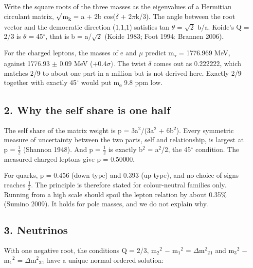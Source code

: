 \documentclass[
  11pt,
]{article}
\begin{document}
Write the square roots of the three masses as the eigenvalues of a Hermitian circulant matrix, \ensuremath{\surd}m\textsubscript{k} = a + 2\textbar b\textbar{} cos(\ensuremath{\delta} + 2\ensuremath{\pi}k/3). The angle between the root vector and the democratic direction (1,1,1) satisfies tan \ensuremath{\theta} = \ensuremath{\sqrt{2}} \textbar b\textbar/a. Koide's Q = 2/3 is \ensuremath{\theta} = 45\ensuremath{^\circ}, that is \textbar b\textbar{} = a/\ensuremath{\sqrt{2}} (Koide 1983; Foot 1994; Brannen 2006).

For the charged leptons, the masses of e and \ensuremath{\mu} predict m\textsubscript{\ensuremath{\tau}} = 1776.969 MeV, against 1776.93 \ensuremath{\pm} 0.09 MeV (+0.4\ensuremath{\sigma}). The twist \ensuremath{\delta} comes out as 0.222222, which matches 2/9 to about one part in a million but is not derived here. Exactly 2/9 together with exactly 45\ensuremath{^\circ} would put m\textsubscript{e} 9.8 ppm low.

\hypertarget{why-the-self-share-is-one-half}{%
\subsection{2. Why the self share is one half}\label{why-the-self-share-is-one-half}}

The self share of the matrix weight is p = 3a\ensuremath{^{2}}/(3a\ensuremath{^{2}} + 6\textbar b\textbar\ensuremath{^{2}}). Every symmetric measure of uncertainty between the two parts, self and relationship, is largest at p = \ensuremath{\frac{1}{2}} (Shannon 1948). And p = \ensuremath{\frac{1}{2}} is exactly \textbar b\textbar\ensuremath{^{2}} = a\ensuremath{^{2}}/2, the 45\ensuremath{^\circ} condition. The measured charged leptons give p = 0.50000.

For quarks, p = 0.456 (down-type) and 0.393 (up-type), and no choice of signs reaches \ensuremath{\frac{1}{2}}. The principle is therefore stated for colour-neutral families only. Running from a high scale should spoil the lepton relation by about 0.35\% (Sumino 2009). It holds for pole masses, and we do not explain why.

\hypertarget{neutrinos}{%
\subsection{3. Neutrinos}\label{neutrinos}}

With one negative root, the conditions Q = 2/3, m\ensuremath{_{2}}\ensuremath{^{2}} \ensuremath{-} m\ensuremath{_{1}}\ensuremath{^{2}} = \ensuremath{\Delta}m\ensuremath{^{2}}\ensuremath{_{2}}\ensuremath{_{1}} and m\ensuremath{_{3}}\ensuremath{^{2}} \ensuremath{-} m\ensuremath{_{1}}\ensuremath{^{2}} = \ensuremath{\Delta}m\ensuremath{^{2}}\ensuremath{_{3}}\ensuremath{_{1}} have a unique normal-ordered solution:
\end{document}
